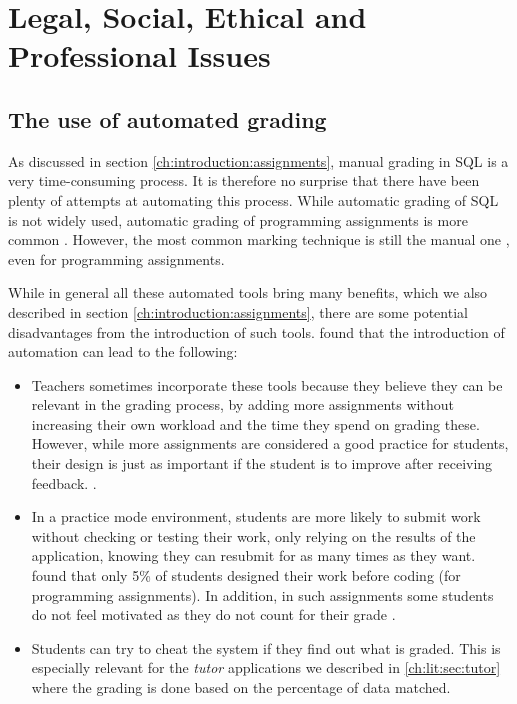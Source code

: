\chapter{Legal, Social, Ethical and Professional Issues}

\section{The use of automated grading}

As discussed in section \ref{ch:introduction:assignments}, manual grading in SQL is a very time-consuming process. It is therefore no surprise that there have been plenty of attempts at automating this process. While automatic grading of SQL is not widely used, automatic grading of programming assignments is more common \citep{literature:assesment:automated:survey}. However, the most common marking technique is still the manual one \citep{literature:assesment:automated:survey}, even for programming assignments.

While in general all these automated tools bring many benefits, which we also described in section \ref{ch:introduction:assignments}, there are some potential disadvantages from the introduction of such tools. \cite{literature:assesment:automated:survey} found that the introduction of automation can lead to the following:
\begin{itemize}
    \item Teachers sometimes incorporate these tools because they believe they can be relevant in the grading process, by adding more assignments without increasing their own workload and the time they spend on grading these. However, while more assignments are considered a good practice for students, their design is just as important if the student is to improve after receiving feedback. \citep{literature:assesment:automated:survey, literature:assement}.
    \item In a practice mode environment, students are more likely to submit work without checking or testing their work, only relying on the results of the application, knowing they can resubmit for as many times as they want. \cite{literature:assesment:automated:survey} found that only 5\% of students designed their work before coding (for programming assignments). In addition, in such assignments some students do not feel motivated as they do not count for their grade \citep{literature:activesql}.
    \item Students can try to cheat the system if they find out what is graded. This is especially relevant for the \textit{tutor} applications we described in \ref{ch:lit:sec:tutor} where the grading is done based on the percentage of data matched.
\end{itemize}

